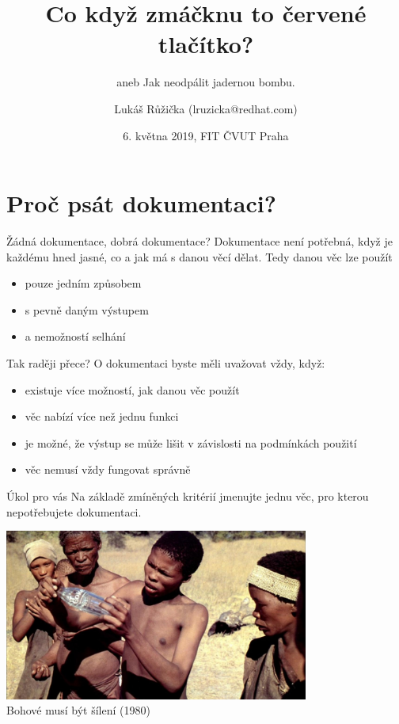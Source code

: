 \documentclass[12pt]{beamer}
\title{Co když zmáčknu to červené tlačítko?}
\subtitle{aneb Jak neodpálit jadernou bombu.}
\author{Lukáš Růžička (lruzicka@redhat.com)}
\date{6. května 2019, FIT ČVUT Praha}
\begin{document}
\begin{frame}[plain]
\maketitle
\end{frame}

    \section{Proč psát dokumentaci?}
    
    	\begin{frame}{Žádná dokumentace, dobrá dokumentace?}
    	  Dokumentace není potřebná, když je každému hned jasné, co a jak má s danou věcí dělat. Tedy danou věc lze použít
    	  
    	  \begin{itemize}
    	  	\item pouze jedním způsobem
    	  	\item s pevně daným výstupem
    	  	\item a nemožností selhání
    	  \end{itemize}
		\end{frame}
	
		\begin{frame}{Tak raději přece?}
		   O dokumentaci byste měli uvažovat vždy, když:
		   \begin{itemize}
		   	\item existuje více možností, jak danou věc použít
		   	\item věc nabízí více než jednu funkci
		   	\item je možné, že výstup se může lišit v závislosti na podmínkách použití
		   	\item věc nemusí vždy fungovat správně
		   \end{itemize}
		\end{frame}
	
		\begin{frame}{Úkol pro vás}
		Na základě zmíněných kritérií jmenujte jednu věc, pro kterou nepotřebujete dokumentaci.
		\end{frame}
	
		\begin{frame}
			\begin{center}
				\includegraphics[width=10cm]{lahev_bohove.jpg}	\\
				Bohové musí být šílení (1980)
			\end{center}
		
		\end{frame}
	
\end{document}
